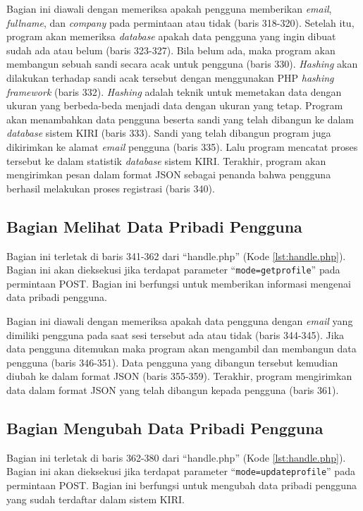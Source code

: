 Bagian ini diawali dengan memeriksa apakah pengguna memberikan \textit{email}, \textit{fullname}, dan \textit{company} pada permintaan atau tidak (baris 318-320). Setelah itu, program akan memeriksa \textit{database} apakah data pengguna yang ingin dibuat sudah ada atau belum (baris 323-327). Bila belum ada, maka program akan membangun sebuah sandi secara acak untuk pengguna (baris 330). \textit{Hashing} akan dilakukan terhadap sandi acak tersebut dengan menggunakan PHP \textit{hashing framework}\cite{openwall} (baris 332). \textit{Hashing} adalah teknik untuk memetakan data dengan ukuran yang berbeda-beda menjadi data dengan ukuran yang tetap\cite{hashing}. Program akan menambahkan data pengguna beserta sandi yang telah dibangun ke dalam \textit{database} sistem KIRI (baris 333). Sandi yang telah dibangun program juga dikirimkan ke alamat \textit{email} pengguna (baris 335). Lalu program mencatat proses tersebut ke dalam statistik \textit{database} sistem KIRI. Terakhir, program akan mengirimkan pesan dalam format JSON sebagai penanda bahwa pengguna berhasil melakukan proses registrasi (baris 340).

\subsection{Bagian Melihat Data Pribadi Pengguna}
\label{sec:lihatdatadiri}
Bagian ini terletak di baris 341-362 dari ``handle.php'' (Kode \ref{lst:handle.php}). Bagian ini akan dieksekusi jika terdapat parameter ``\texttt{mode=getprofile}'' pada permintaan POST. Bagian ini berfungsi untuk memberikan informasi mengenai data pribadi pengguna.

Bagian ini diawali dengan memeriksa apakah data pengguna dengan \textit{email} yang dimiliki pengguna pada saat sesi tersebut ada atau tidak (baris 344-345). Jika data pengguna ditemukan maka program akan mengambil dan membangun data pengguna (baris 346-351). Data pengguna yang dibangun tersebut kemudian diubah ke dalam format JSON (baris 355-359). Terakhir, program mengirimkan data dalam format JSON yang telah dibangun kepada pengguna (baris 361).

\subsection{Bagian Mengubah Data Pribadi Pengguna}
\label{sec:ubahdatadiri}
Bagian ini terletak di baris 362-380 dari ``handle.php'' (Kode \ref{lst:handle.php}). Bagian ini akan dieksekusi jika terdapat parameter ``\texttt{mode=updateprofile}'' pada permintaan POST. Bagian ini berfungsi untuk mengubah data pribadi pengguna yang sudah terdaftar dalam sistem KIRI.

